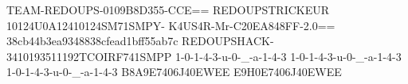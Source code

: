 TEAM-REDOUPS-0109B8D355-CCE==
REDOUPSTRICKEUR 10124U0A12410124SM71SMPY-
K4US4R-Mr-C20EA848FF-2.0==
38cb44b3ea9348838cfead1bff55ab7c
REDOUPSHACK-3410193511192TCOIRF741SMPP
1-0-1-4-3-u-0-_-a-1-4-3
1-0-1-4-3-u-0-_-a-1-4-3
1-0-1-4-3-u-0-_-a-1-4-3
B8A9E7406J40EWEE
E9H0E7406J40EWEE
